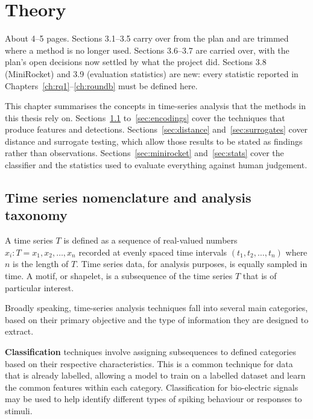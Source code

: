 \chapter{Theory}
\label{ch:theory}

\begin{instructions}
About 4--5 pages. Sections 3.1--3.5 carry over from the plan and are trimmed where a method is no longer used.
Sections 3.6--3.7 are carried over, with the plan's open decisions now settled by what the project did. Sections 3.8
(MiniRocket) and 3.9 (evaluation statistics) are new: every statistic reported in
Chapters~\ref{ch:rq1}--\ref{ch:roundb} must be defined here.
\end{instructions}

This chapter summarises the concepts in time-series analysis that the methods in this thesis rely on. Sections~\ref{sec:nomenclature} to~\ref{sec:encodings} cover the techniques that produce features and detections. Sections~\ref{sec:distance} and~\ref{sec:surrogates} cover distance and surrogate testing, which allow those results to be stated as findings rather than observations. Sections~\ref{sec:minirocket} and~\ref{sec:stats} cover the classifier and the statistics used to evaluate everything against human judgement.

\section{Time series nomenclature and analysis taxonomy}
\label{sec:nomenclature}

A time series $T$ is defined as a sequence of real-valued numbers $x_i : T = x_1, x_2, \ldots, x_n$ recorded at evenly spaced time intervals $(t_1, t_2, \ldots, t_n)$ where $n$ is the length of $T$. Time series data, for analysis purposes, is equally sampled in time. A motif, or shapelet, is a subsequence of the time series $T$ that is of particular interest.

Broadly speaking, time-series analysis techniques fall into several main categories, based on their primary objective and the type of information they are designed to extract.

\textbf{Classification} techniques involve assigning subsequences to defined categories based on their respective characteristics. This is a common technique for data that is already labelled, allowing a model to train on a labelled dataset and learn the common features within each category. Classification for bio-electric signals may be used to help identify different types of spiking behaviour or responses to stimuli.

